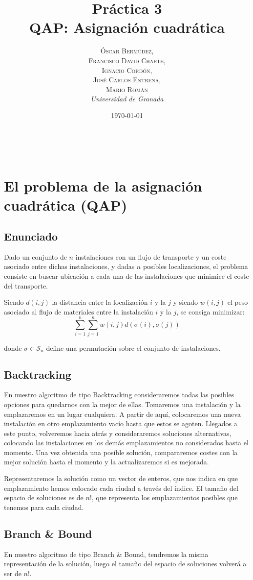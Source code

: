 \documentclass[a4paper, 11pt]{article} %
\title{\textbf{Práctica 3}\\ %
QAP: Asignación cuadrática} %
\author{\textsc{Óscar Bermúdez,\\Francisco David Charte,\\Ignacio Cordón,\\José Carlos Entrena,\\Mario Román} %
\\{\textit{Universidad de Granada}}} %
\date{\today} %
\makeatletter
\renewcommand{\maketitle}{ %
\begin{flushright} %
{\LARGE\@title} %

\vspace{50pt} %

{\large\@author} %
\\\@date %

\vspace{40pt} %
\end{flushright}
}
\makeatother
\begin{document}
\maketitle %

\renewcommand{\abstractname}{Resumen} %
\begin{abstract}
\end{abstract}
{\parskip=2pt
\tableofcontents
}
\pagebreak

\section{El problema de la asignación cuadrática (QAP)}
      \subsection{Enunciado}
	Dado un conjunto de $n$ instalaciones con un flujo de transporte y
	un coste asociado entre dichas instalaciones, y dadas $n$ posibles localizaciones,
	el problema consiste en buscar ubicación a cada una de las instalaciones que
	minimice el coste del transporte.
	
	Siendo $d(i,j)$ la distancia entre la localización $i$ y la $j$
	y siendo $w(i,j)$ el peso asociado al flujo de materiales entre la instalación
	$i$ y la $j$, se consiga minimizar:
	\begin{equation}
	\sum_{i=1}^n \sum_{j=1}^nw(i,j) d(\sigma(i),\sigma(j))
	\label{coste}
	\end{equation}

	donde $\sigma \in \mathcal{S}_n$ define una permutación sobre el conjunto de instalaciones.

    
      \subsection{Backtracking}
	En nuestro algoritmo de tipo Backtracking consideraremos todas las posibles opciones para quedarnos con la mejor de ellas.
	Tomaremos una instalación y la emplazaremos en un lugar cualquiera. A partir de aquí, colocaremos una nueva instalación
	en otro emplazamiento vacío hasta que estos se agoten. Llegados a este punto, volveremos hacia atrás y consideraremos soluciones alternativas, colocando las instalaciones en los demás emplazamientos no considerados hasta el momento. Una vez obtenida una posible solución, compararemos costes con la mejor solución hasta el momento y la actualizaremos si es mejorada.       
	
	Representaremos la solución como un vector de enteros, que nos indica en que emplazamiento hemos colocado cada ciudad a 
	través del índice. El tamaño del espacio de soluciones es de $n!$, que representa los emplazamientos posibles que tenemos 
	para cada ciudad. 
      
      \subsection{Branch \& Bound}
      
    En nuestro algoritmo de tipo Branch \& Bound, tendremos la misma representación de la solución, luego el tamaño del espacio de soluciones volverá a ser de $n!$. 
	
\end{document}
